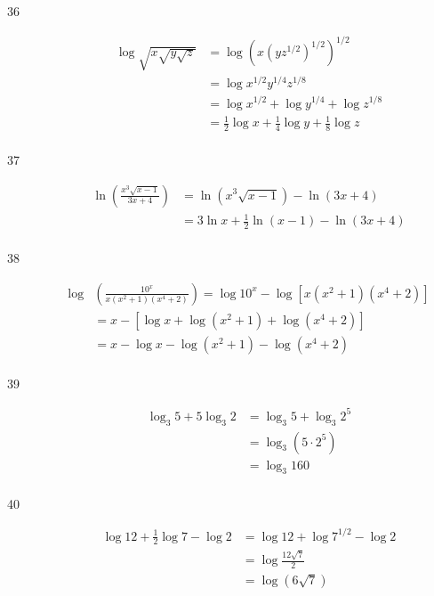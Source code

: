 \documentclass{exam}
\begin{document}
\begin{description}
      \item[36] 
        \begin{align*}
          \log \sqrt{x \sqrt{y \sqrt{z}}} &= \log (x (y z^{1/2})^{1/2})^{1/2} \\
                                          &= \log x^{1/2}y^{1/4}z^{1/8} \\
                                          &= \log x^{1/2} + \log y^{1/4} + \log z^{1/8} \\
                                          &= \boxed{\frac{1}{2} \log x + \frac{1}{4} \log y + \frac{1}{8} \log z}  \\
        \end{align*}

      \item[37] 
        \begin{align*}
          \ln \left( \frac{x^3 \sqrt{x - 1}}{3x + 4} \right) &= \ln (x^3 \sqrt{x - 1}) - \ln (3x + 4) \\
                                                             &= \boxed{3 \ln x + \frac{1}{2} \ln (x - 1) - \ln (3x + 4)} \\
        \end{align*}

      \item[38] 
        \begin{align*}
          \log & \left( \frac{10^x}{x \left(x^2 + 1 \right) \left(x^4 + 2 \right)} \right) = \log 10^x - \log \left[x \left(x^2 + 1 \right) \left(x^4 + 2 \right) \right] \\
               & = x - \left[ \log x + \log \left(x^2 + 1 \right) + \log \left(x^4 + 2 \right) \right] \\
               & = \boxed{x - \log x - \log \left(x^2 + 1\right) - \log \left(x^4 + 2\right)} \\
        \end{align*}

      \item[39] 
        \begin{align*}
          \log_3 5 + 5 \log_3 2 &= \log_3 5 + \log_3 2^5 \\
                                &= \log_3 \left(5 \cdot 2^5 \right) \\
                                &= \boxed{\log_3 160} \\
        \end{align*}

      \item[40] 
        \begin{align*}
          \log 12 + \frac{1}{2} \log 7 - \log 2 &= \log 12 + \log 7^{1/2} - \log 2 \\
                                                &= \log \frac{12 \sqrt{7}}{2} \\
                                                &= \boxed{\log \left(6 \sqrt{7}\right)} \\
        \end{align*}


\end{description}
\end{document}
